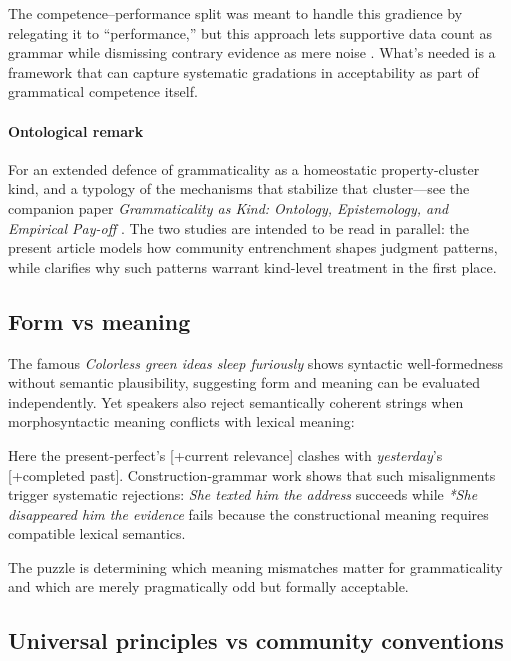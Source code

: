 \documentclass[12pt]{article}
\begin{document}
The competence–performance split was meant to handle this gradience by relegating it to \enquote{performance,} but this approach lets supportive data count as grammar while dismissing contrary evidence as mere noise \parencite[71]{schutze2016}. What's needed is a framework that can capture systematic gradations in acceptability as part of grammatical competence itself.

\paragraph{Ontological remark}
For an extended defence of grammaticality as a homeostatic property-cluster kind, and a typology of the mechanisms that stabilize that cluster—see the companion paper \textit{Grammaticality as Kind: Ontology, Epistemology, and Empirical Pay-off} \parencite{ReynoldsKind_inprep}.  The two studies are intended to be read in parallel: the present article models how community entrenchment shapes judgment patterns, while \textcite{ReynoldsKind_inprep} clarifies why such patterns warrant kind-level treatment in the first place.

\subsection{Form vs meaning}

The famous \textit{Colorless green ideas sleep furiously} shows syntactic well‑formedness without semantic plausibility, suggesting form and meaning can be evaluated independently. Yet speakers also reject semantically coherent strings when morphosyntactic meaning conflicts with lexical meaning:

\z

Here the present‑perfect's [+current relevance] clashes with \textit{yesterday}'s [+completed past]. Construction‑grammar work \parencite{goldberg1995constructions} shows that such misalignments trigger systematic rejections: \textit{She texted him the address} succeeds while \textit{*She disappeared him the evidence} fails because the constructional meaning requires compatible lexical semantics.

The puzzle is determining which meaning mismatches matter for grammaticality and which are merely pragmatically odd but formally acceptable.

\subsection{Universal principles vs community conventions}
\end{document}
